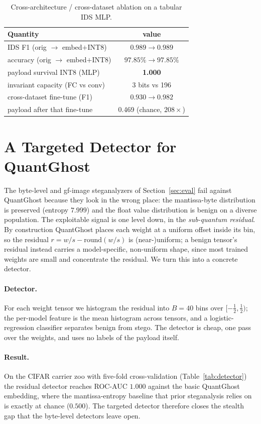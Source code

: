\documentclass[a4paper,fleqn]{cas-dc}
\theoremstyle{plain}
\theoremstyle{remark}
\newcommand{\sys}{\mbox{QuantGhost}}
\begin{document}
\begin{table}[t]\centering
\caption{Cross-architecture / cross-dataset ablation on a tabular IDS MLP.}
\label{tab:ablation}
\begin{tabular*}{\columnwidth}{@{\extracolsep{\fill}}lc@{}}
\toprule
Quantity & value\\
\midrule
IDS F1 (orig $\to$ embed$+$INT8) & $0.989\to0.989$\\
accuracy (orig $\to$ embed$+$INT8) & $97.85\%\to97.85\%$\\
payload survival INT8 (MLP) & \textbf{1.000}\\
invariant capacity (FC vs conv) & 3 bits vs 196\\
cross-dataset fine-tune (F1) & $0.930\to0.982$\\
\quad payload after that fine-tune & 0.469 (chance, $208\times$)\\
\bottomrule
\end{tabular*}
\end{table}

\section{A Targeted Detector for \sys}\label{sec:detector}
The byte-level and gf-image steganalyzers of Section~\ref{sec:eval} fail against \sys{}
because they look in the wrong place: the mantissa-byte distribution is preserved
(entropy $7.999$) and the float value distribution is benign on a diverse population.
The exploitable signal is one level down, in the \emph{sub-quantum residual}. By
construction \sys{} places each weight at a uniform offset inside its bin, so the
residual $r=w/s-\mathrm{round}(w/s)$ is (near-)uniform; a benign tensor's residual instead
carries a model-specific, non-uniform shape, since most trained weights are small and
concentrate the residual. We turn this into a concrete detector.

\paragraph{Detector.} For each weight tensor we histogram the residual into $B{=}40$ bins
over $[-\tfrac12,\tfrac12)$; the per-model feature is the mean histogram across tensors,
and a logistic-regression classifier separates benign from stego. The detector is
cheap, one pass over the weights, and uses no labels of the payload itself.

\paragraph{Result.} On the CIFAR carrier zoo with five-fold cross-validation
(Table~\ref{tab:detector}) the residual detector reaches ROC-AUC $1.000$ against the
basic \sys{} embedding, where the mantissa-entropy baseline that prior steganalysis
relies on is exactly at chance ($0.500$). The targeted detector therefore closes the
stealth gap that the byte-level detectors leave open.
\end{document}
